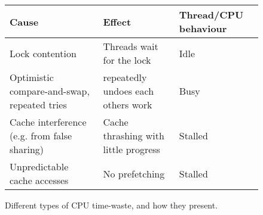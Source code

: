 \begin{figure}[hbtp]
\centering
\begin{tabular}{|p{4cm}|p{4cm}|p{3cm}|}
\hline
Cause & Effect & Thread/CPU behaviour \\
\hline
\hline
Lock contention & Threads wait for the lock & Idle \\
\hline
Optimistic compare-and-swap, repeated tries & repeatedly undoes each others work
& Busy \\
\hline
Cache interference (e.g. from false sharing)& Cache thrashing with
little progress & Stalled \\
\hline
Unpredictable cache accesses & No prefetching & Stalled \\
\hline
\end{tabular}
	\caption{Different types of CPU time-waste, and how they present.}
	\label{table:timewaste}
\end{figure}
